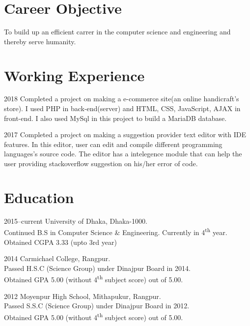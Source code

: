 \documentclass[a4paper]{article}
\begin{document}
\section{Career Objective}
\begin{CV}
\item To build up an efficient carrer in the computer science and engineering and thereby serve humanity.
  \end{CV}

\section{Working Experience}

\begin{CV}

\item[2018] Completed a project on making a e-commerce site(an online handicraft's store). I used PHP in back-end(server) and HTML, CSS, JavaScript, AJAX in front-end. I also used MySql in this project to build a MariaDB database.
\item[2017] Completed a project on making a suggestion provider text editor with IDE features. In this editor, user can edit and compile different programming languages's source code. The editor has a intelegence module that can help the user providing stackoverflow suggestion on his/her error of code.
\end{CV}


\section{Education}

\begin{CV}
\item[2015--current] University of Dhaka, Dhaka-1000.\\Continued  B.S in Computer Science \& Engineering. Currently in 4\textsuperscript{th} year.\\Obtained CGPA 3.33 (upto 3rd year)
\item[2014] Carmichael College, Rangpur.\\Passed H.S.C (Science Group) under Dinajpur Board in 2014.\\Obtained GPA 5.00 (without 4\textsuperscript{th} subject score) out of 5.00.
\item[2012] Moyenpur High School, Mithapukur, Rangpur.\\Passed S.S.C (Science Group) under Dinajpur Board in 2012.\\Obtained GPA 5.00 (without 4\textsuperscript{th} subject score) out of 5.00.
\end{CV}
\end{document}
